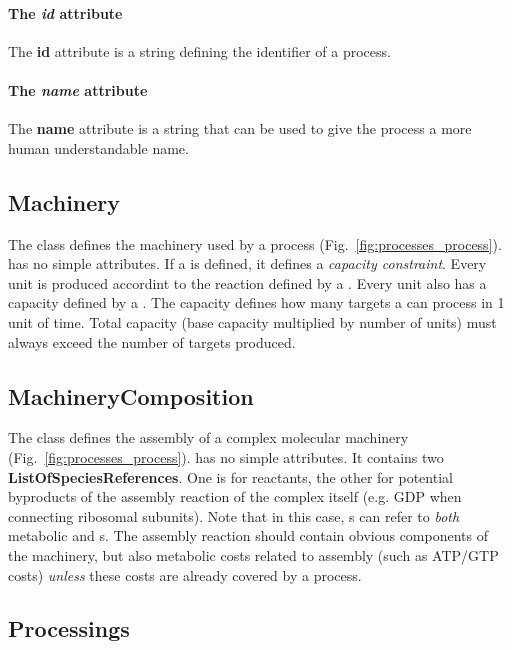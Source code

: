\paragraph{The \textit{id} attribute}
The \textbf{id} attribute is a string defining the identifier of a process.

\paragraph{The \textit{name} attribute}
The \textbf{name} attribute is a string that can be used to give the process
a more human understandable name.


\subsection{Machinery}
\label{sec:machinery}

The \machinery{} class defines the machinery used by a process
(Fig.~\ref{fig:processes_process}).
\machinery{} has no simple attributes.
If a \machinery{} is defined, it defines a \emph{capacity constraint}.
Every \machinery{} unit is produced accordint to the reaction
defined by a \machinerycomposition.
Every unit also has a capacity defined by a \targetvalue.
The capacity defines how many targets a \machinery{} can process in 1 unit of
time.
Total capacity (base capacity multiplied by number of \machinery{} units)
must always exceed the number of targets produced.


\subsection{MachineryComposition}
\label{sec:machinery_composition}

The \machinerycomposition{} class defines the assembly of a complex
molecular machinery (Fig.~\ref{fig:processes_process}).
\machinerycomposition{} has no simple attributes.
It contains two \textbf{ListOfSpeciesReferences}.
One is for reactants, the other for potential byproducts of the assembly reaction
of the complex itself (e.g. GDP when connecting ribosomal subunits).
Note that in this case, \speciesreference{}s can refer to \emph{both}
metabolic \species{} and \macromolecule{}s.
The assembly reaction should contain obvious components of the machinery,
but also metabolic costs related to assembly (such as ATP/GTP costs)
\emph{unless} these costs are already covered by a process.


\subsection{Processings}
\label{sec:processings}


